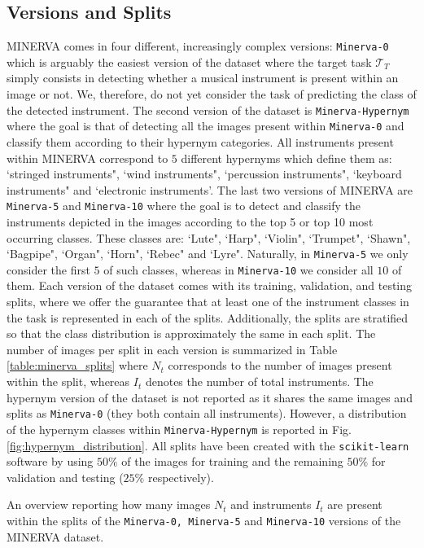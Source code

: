 \subsection{Versions and Splits}

MINERVA comes in four different, increasingly complex versions: \texttt{Minerva-0} which is arguably the easiest version of the dataset where the target task $\mathcal{T}_T$ simply consists in detecting whether a musical instrument is present within an image or not. We, therefore, do not yet consider the task of predicting the class of the detected instrument. The second version of the dataset is \texttt{Minerva-Hypernym} where the goal is that of detecting all the images present within \texttt{Minerva-0} and classify them according to their hypernym categories. All instruments present within MINERVA correspond to $5$ different hypernyms which define them as: `stringed instruments", `wind instruments", `percussion instruments", `keyboard instruments" and `electronic instruments'. The last two versions of MINERVA are \texttt{Minerva-5} and \texttt{Minerva-10} where the goal is to detect and classify the instruments depicted in the images according to the top 5 or top 10 most occurring classes. These classes are: `Lute", `Harp", `Violin", `Trumpet", `Shawn", `Bagpipe", `Organ", `Horn", `Rebec" and `Lyre". Naturally, in \texttt{Minerva-5} we only consider the first $5$ of such classes, whereas in \texttt{Minerva-10} we consider all $10$ of them. Each version of the dataset comes with its training, validation, and testing splits, where we offer the guarantee that at least one of the instrument classes in the task is represented in each of the splits. Additionally, the splits are stratified so that the class distribution is approximately the same in each split. The number of images per split in each version is summarized in Table \ref{table:minerva_splits} where $N_t$ corresponds to the number of images present within the split, whereas $I_t$ denotes the number of total instruments. The hypernym version of the dataset is not reported as it shares the same images and splits as \texttt{Minerva-0} (they both contain all instruments). However, a distribution of the hypernym classes within \texttt{Minerva-Hypernym} is reported in Fig. \ref{fig:hypernym_distribution}. All splits have been created with the \texttt{scikit-learn} software \cite{pedregosa2011scikit} by using $50\%$ of the images for training and the remaining $50\%$ for validation and testing ($25\%$ respectively). 

\begin{table}[ht!]
\caption{An overview reporting how many images $N_t$ and instruments $I_t$ are present within the splits of the \texttt{Minerva-0, Minerva-5} and \texttt{Minerva-10} versions of the MINERVA dataset.}
	
\label{table:minerva_splits}
\end{table}


